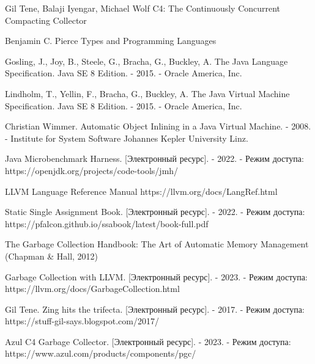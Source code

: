 \begingroup 
\renewcommand{\section}[2]{\anonsection{Библиографический список}}
\begin{flushleft}
\begin{thebibliography}{}

Gil Tene, Balaji Iyengar, Michael Wolf C4: The Continuously Concurrent Compacting Collector

Benjamin C. Pierce Types and Programming Languages

Gosling, J., Joy, B., Steele, G., Bracha, G., Buckley, A. The Java Language
Specification. Java SE 8 Edition. - 2015. - Oracle America, Inc.

Lindholm, T., Yellin, F., Bracha, G., Buckley, A. The Java Virtual Machine
Specification. Java SE 8 Edition. - 2015. - Oracle America, Inc.
	
Christian Wimmer. Automatic Object Inlining in a Java Virtual Machine. - 2008. - Institute for System Software
Johannes Kepler University Linz.

Java Microbenchmark Harness. [Электронный ресурс]. - 2022. - Режим доступа: https://openjdk.org/projects/code-tools/jmh/
	
LLVM Language Reference Manual https://llvm.org/docs/LangRef.html
	
Static Single Assignment Book. [Электронный ресурс]. - 2022. - Режим доступа: https://pfalcon.github.io/ssabook/latest/book-full.pdf
	
The Garbage Collection Handbook: The Art of Automatic Memory Management (Chapman \& Hall, 2012)
	
Garbage Collection with LLVM. [Электронный ресурс]. - 2023. - Режим доступа: https://llvm.org/docs/GarbageCollection.html
	
Gil Tene. Zing hits the trifecta. [Электронный ресурс]. - 2017. - Режим доступа: https://stuff-gil-says.blogspot.com/2017/

Azul C4 Garbage Collector. [Электронный ресурс]. - 2023. - Режим доступа: https://www.azul.com/products/components/pgc/


\end{thebibliography}
\end{flushleft}
